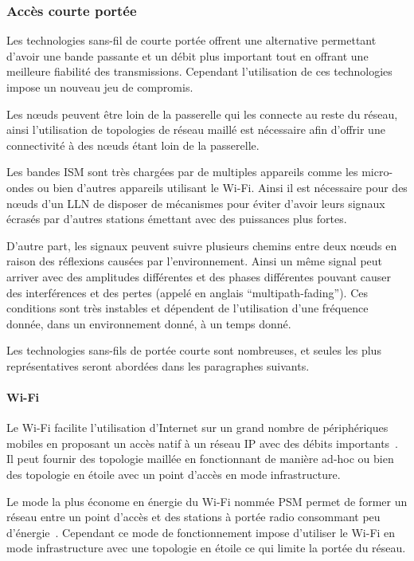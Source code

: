 \subsubsection{Accès courte portée}
\label{gw:short_range}

Les technologies sans-fil de courte portée offrent une alternative permettant d'avoir une bande passante et un débit plus important tout en offrant une meilleure fiabilité des transmissions.
Cependant l'utilisation de ces technologies impose un nouveau jeu de compromis.

Les nœuds peuvent être loin de la passerelle qui les connecte au reste du réseau, ainsi l'utilisation de topologies de réseau maillé est nécessaire afin d'offrir une connectivité à des nœuds étant loin de la passerelle.

Les bandes \ac{ISM} sont très chargées par de multiples appareils comme les micro-ondes ou bien d'autres appareils utilisant le Wi-Fi.
Ainsi il est nécessaire pour des nœuds d'un \ac{LLN} de disposer de mécanismes pour éviter d'avoir leurs signaux écrasés par d'autres stations émettant avec des puissances plus fortes.

D'autre part, les signaux peuvent suivre plusieurs chemins entre deux nœuds en raison des réflexions causées par l’environnement.
Ainsi un même signal peut arriver avec des amplitudes différentes et des phases différentes pouvant causer des interférences et des pertes (appelé en anglais ``multipath-fading'').
Ces conditions sont très instables et dépendent de l'utilisation d'une fréquence donnée, dans un environnement donné, à un temps donné.

Les technologies sans-fils de portée courte sont nombreuses, et seules les plus représentatives seront abordées dans les paragraphes suivants.

\paragraph{Wi-Fi}

Le Wi-Fi facilite l'utilisation d'Internet sur un grand nombre de périphériques mobiles en proposant un accès natif à un réseau IP avec des débits importants~\cite{lee2010mobile}.
Il peut fournir des topologie maillée en fonctionnant de manière ad-hoc ou bien des topologie en étoile avec un point d'accès en mode infrastructure.

Le mode la plus économe en énergie du Wi-Fi nommée \ac{PSM} permet de former un réseau entre un point d'accès et des stations à portée radio consommant peu d'énergie~\cite{anastasi2008802,tozlu2011feasibility}.
Cependant ce mode de fonctionnement impose d'utiliser le Wi-Fi en mode infrastructure avec une topologie en étoile ce qui limite la portée du réseau.

